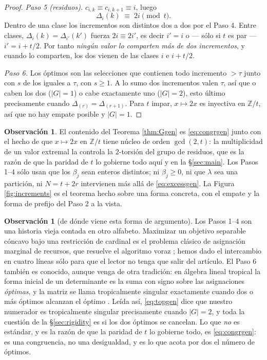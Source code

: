 \documentclass[11pt,reqno]{amsart}
\theoremstyle{plain}
\theoremstyle{definition}
\newtheorem{remark}[theorem]{Observación}
\newcommand{\ZZ}{\mathbb{Z}}
\begin{document}
\begin{proof}
\emph{Paso 5 (residuos).} $c_{i,k}\equiv c_{i,k+1}\equiv i$, luego
\begin{equation}\label{eq:congrgen}
  \Delta_i(k)\;\equiv\;2i \pmod t .
\end{equation}
Dentro de una clase los incrementos son distintos dos a dos por el Paso 4. Entre clases,
$\Delta_i(k)=\Delta_{i'}(k')$ fuerza $2i\equiv2i'$, es decir $i'=i$ o --- sólo si $t$ es par ---
$i'=i+t/2$. Por tanto \emph{ningún valor lo comparten más de dos incrementos}, y cuando lo comparten,
los dos vienen de las clases $i$ e $i+t/2$.

\emph{Paso 6.} Los óptimos son las selecciones que contienen todo incremento $>\tau$ junto con $s$ de
los iguales a $\tau$, con $s\ge1$. A lo sumo dos incrementos valen $\tau$, así que o caben los dos
($|G|=1$) o cabe exactamente uno ($|G|=2$), esto último precisamente cuando
$\Delta_{(r)}=\Delta_{(r+1)}$. Para $t$ impar, $x\mapsto2x$ es inyectiva en $\ZZ/t$, así que no hay
empate posible y $|G|=1$.
\end{proof}

\begin{remark}
El contenido del Teorema \ref{thm:Ggen} es \eqref{eq:congrgen} junto con el hecho de que
$x\mapsto2x$ en $\ZZ/t$ tiene núcleo de orden $\gcd(2,t)$: la multiplicidad de un valor extremal la
controla la $2$-torsión del grupo de residuos, que es la razón de que la paridad de $t$ lo gobierne
todo aquí y en la \S\ref{sec:main}. Los Pasos 1--4 sólo usan que los $\beta_j$ sean enteros
distintos; ni $\beta_j\ge0$, ni que $\lambda$ sea una partición, ni $N=t+2r$ intervienen más allá de
\eqref{eq:excessgen}. La Figura \ref{fig:increments} es el teorema hecho sobre una forma concreta,
con el empate y la forma de prefijo del Paso 2 a la vista.
\end{remark}

\begin{remark}[de dónde viene esta forma de argumento]
Los Pasos 1--4 son una historia vieja contada en otro alfabeto. Maximizar un objetivo separable
cóncavo bajo una restricción de cardinal es el problema clásico de asignación marginal de recursos,
que resuelve el algoritmo voraz \cite{FG86,IK88}; hemos dado el intercambio en cuatro líneas sólo para
que el lector no tenga que salir del artículo. El Paso 6 también es conocido, aunque venga de otra
tradición: en álgebra lineal tropical la forma inicial de un determinante es la suma con signo sobre
las asignaciones \emph{óptimas}, y la matriz se llama tropicalmente singular exactamente cuando dos o
más óptimos alcanzan el óptimo \cite{TropCramer}. Leída así, \eqref{eq:topgen} dice que nuestro
numerador es tropicalmente singular precisamente cuando $|G|=2$, y toda la cuestión de la
\S\ref{sec:rigidity} es si los dos óptimos se cancelan. Lo que \emph{no} es estándar, y es la razón de
que la paridad de $t$ lo gobierne todo, es \eqref{eq:congrgen}: es una congruencia, no una
desigualdad, y es lo que acota por dos el número de óptimos.
\end{remark}
\end{document}
